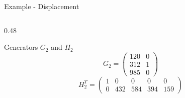 \begin{frame}{Example - Displacement}
\begin{columns}[t]
\begin{column}{0.48\textwidth}
      \begin{block}{Generators $G_2$ and $H_2$}
        {\footnotesize
          \[
            G_2 =
            \begin{pmatrix}
              120 & 0 \\
              312 & 1 \\
              985 & 0
            \end{pmatrix}
          \]
          \[
            H_2^{T} =
            \begin{pmatrix}
              1   & 0   & 0   & 0   & 0   \\
              0   & 432 & 584 & 394 & 159
            \end{pmatrix}
          \]
        }
      \end{block}
    \end{column}

  \end{columns}
\end{frame}
